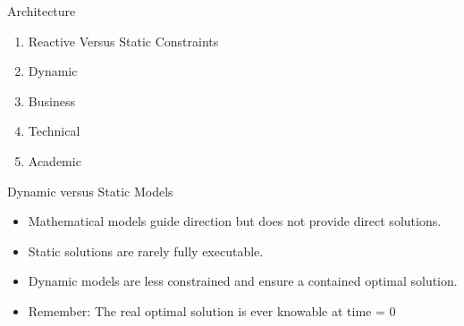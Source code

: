 \documentclass{beamer}
\begin{document}
\begin{frame}[t]{Architecture}
\end{frame}

\begin{frame}[t]{}
    \begin{block}{}
        \begin{enumerate}
			\item Reactive Versus Static Constraints
			\item Dynamic
            \item Business
            \item Technical
            \item Academic
        \end{enumerate}
    \end{block}
\end{frame}

\begin{frame}[t]{}
    \begin{block}{Dynamic versus Static Models}
			
			\drawReactiveConstraints{}

		\begin{itemize}
			\item Mathematical models guide direction but does not provide direct solutions.
			\item Static solutions are rarely fully executable.
			\item Dynamic models are less constrained and ensure a contained optimal solution.
			\item Remember: The real optimal solution is ever knowable at time = 0
		\end{itemize}
    \end{block}
\end{frame}

\begin{frame}[t]{}
    \begin{block}{}





		
    \end{block}
\end{frame}
\end{document}

